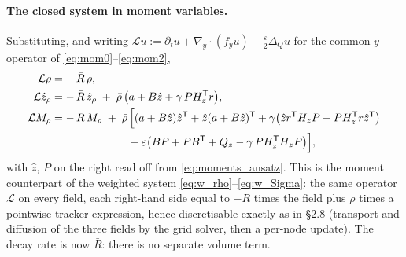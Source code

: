 \documentclass[11pt,a4paper]{article}
\newcommand{\T}{^{\mathsf T}}
\newcommand{\zh}{\hat{z}}
\newcommand{\zr}{\hat{z}_{\rho}}   %
\newcommand{\Mr}{M_{\rho}}          %
\newcommand{\eps}{\varepsilon}
\newcommand{\gy}{\nabla_{\!y}}
\theoremstyle{plain}
\theoremstyle{definition}
\theoremstyle{remark}
\begin{document}
\paragraph{The closed system in moment variables.} Substituting, and writing $\mathcal L u := \partial_tu + \gy\!\cdot\!(f_yu) - \tfrac\eps2\Delta_Qu$ for the common $y$-operator of \eqref{eq:mom0}--\eqref{eq:mom2},
\begin{align}
  \mathcal L\bar\rho &= -\,\bar R\,\bar\rho, \label{eq:cl_rho}\\
  \mathcal L\zr &= -\,\bar R\,\zr \;+\; \bar\rho\,\big(a + B\zh + \gamma\,PH_z\T r\big), \label{eq:cl_z}\\
  \mathcal L\Mr &= -\,\bar R\,\Mr \;+\; \bar\rho\,\Big[(a+B\zh)\zh\T + \zh(a+B\zh)\T + \gamma\big(\zh r\T H_zP + PH_z\T r\zh\T\big) \notag\\
  &\qquad\qquad\qquad\quad + \eps\big(BP + PB\T + Q_z - \gamma\,PH_z\T H_zP\big)\Big], \label{eq:cl_M}
\end{align}
with $\zh$, $P$ on the right read off from \eqref{eq:moments_ansatz}. This is the moment counterpart of the weighted system \eqref{eq:w_rho}--\eqref{eq:w_Sigma}: the same operator $\mathcal L$ on every field, each right-hand side equal to $-\bar R$ times the field plus $\bar\rho$ times a pointwise tracker expression, hence discretisable exactly as in \S2.8 (transport and diffusion of the three fields by the grid solver, then a per-node update). The decay rate is now $\bar R$: there is no separate volume term.
\end{document}
